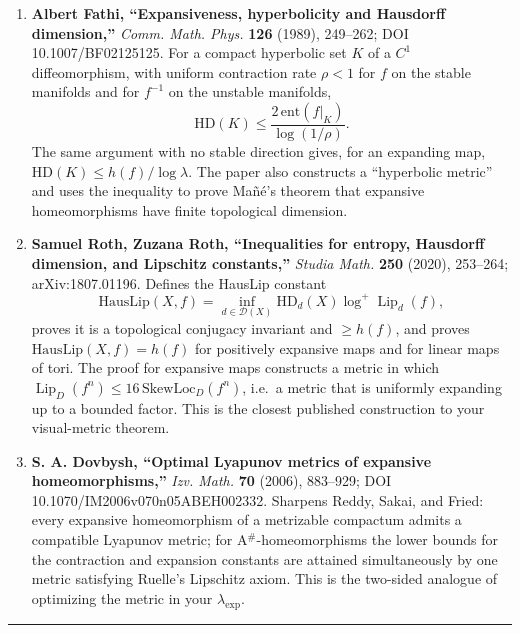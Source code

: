 \documentclass[
]{article}
\begin{document}
\begin{enumerate}
  \(d(x,y)\), \[
  D_d(X)\log\lambda_2\le h(f)\le D_d(X)\log\lambda_1.
  \] Remark 4.4 deduces \(\log\lambda\le h(f)/\dim X\) for a strictly
  expanding ratio \(\lambda\); hence the set of expanding ratios is
  bounded above by \(e^{h/\dim X}\). This is the closest ``set of
  possible expanding constants'' result.
\item
  \textbf{Albert Fathi, ``Expansiveness, hyperbolicity and Hausdorff
  dimension,''} \emph{Comm. Math. Phys.} \textbf{126} (1989), 249--262;
  DOI 10.1007/BF02125125. For a compact hyperbolic set \(K\) of a
  \(C^1\) diffeomorphism, with uniform contraction rate \(\rho<1\) for
  \(f\) on the stable manifolds and for \(f^{-1}\) on the unstable
  manifolds, \[
  \mathrm{HD}(K)\le \frac{2\,\mathrm{ent}(f|_K)}{\log(1/\rho)}.
  \] The same argument with no stable direction gives, for an expanding
  map, \(\mathrm{HD}(K)\le h(f)/\log\lambda\). The paper also constructs
  a ``hyperbolic metric'' and uses the inequality to prove
  Ma\~{n}\'{e}'s theorem that expansive homeomorphisms have finite
  topological dimension.
\item
  \textbf{Samuel Roth, Zuzana Roth, ``Inequalities for entropy,
  Hausdorff dimension, and Lipschitz constants,''} \emph{Studia Math.}
  \textbf{250} (2020), 253--264; arXiv:1807.01196. Defines the HausLip
  constant \[
  \mathrm{HausLip}(X,f)=\inf_{d\in\mathcal D(X)}\mathrm{HD}_d(X)\log^+\operatorname{Lip}_d(f),
  \] proves it is a topological conjugacy invariant and \(\ge h(f)\),
  and proves \(\mathrm{HausLip}(X,f)=h(f)\) for positively expansive
  maps and for linear maps of tori. The proof for expansive maps
  constructs a metric in which
  \(\operatorname{Lip}_D(f^n)\le16\,\mathrm{SkewLoc}_D(f^n)\), i.e.~a
  metric that is uniformly expanding up to a bounded factor. This is the
  closest published construction to your visual-metric theorem.
\item
  \textbf{S. A. Dovbysh, ``Optimal Lyapunov metrics of expansive
  homeomorphisms,''} \emph{Izv. Math.} \textbf{70} (2006), 883--929; DOI
  10.1070/IM2006v070n05ABEH002332. Sharpens Reddy, Sakai, and Fried:
  every expansive homeomorphism of a metrizable compactum admits a
  compatible Lyapunov metric; for A$^{\#}$-homeomorphisms the lower
  bounds for the contraction and expansion constants are attained
  simultaneously by one metric satisfying Ruelle's Lipschitz axiom. This
  is the two-sided analogue of optimizing the metric in your
  \(\lambda_{\exp}\).
\end{enumerate}

\begin{center}\rule{0.5\linewidth}{0.5pt}\end{center}
\end{document}
